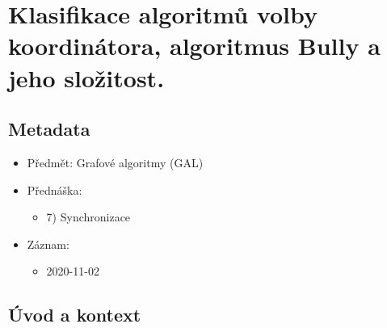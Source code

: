 

\chapter{Klasifikace algoritmů volby koordinátora, algoritmus Bully a jeho složitost.}


\section{Metadata}

\begin{itemize}
    \item Předmět: Grafové algoritmy (GAL)
    \item Přednáška:
    \begin{itemize}
        \item 7) Synchronizace
    \end{itemize}
    \item Záznam:
    \begin{itemize}
        \item 2020-11-02
    \end{itemize}
\end{itemize}


\section{Úvod a kontext}

